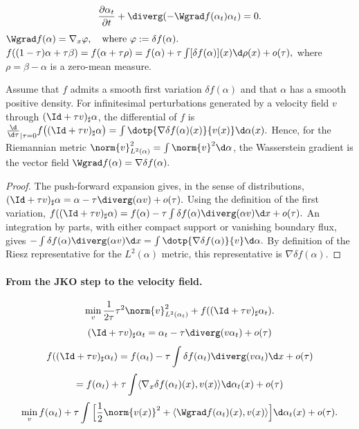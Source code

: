 \begin{equation}
\frac{\partial \alpha_t}{\partial t} + \diverg(-\Wgrad f(\alpha_t) \alpha_t) = 0. \label{eq:wassflow-pde}
\end{equation}
\(\Wgrad f(\alpha) = \nabla_x \varphi, \quad \text{where } \varphi:= \delta f(\alpha).\)
\(f((1-\tau)\alpha + \tau \beta) = f(\alpha + \tau \rho) = f(\alpha) + \tau \int [\delta f(\alpha)](x) \d \rho(x) + o(\tau),\)
where $\rho = \beta - \alpha$ is a zero-mean measure.

\begin{proposition}\label{prop-formal-wass-gradient}
Assume that $f$ admits a smooth first variation $\delta f(\alpha)$ and that $\alpha$ has a smooth positive density. For infinitesimal perturbations generated by a velocity field $v$ through $(\Id+\tau v)_\sharp\alpha$, the differential of $f$ is
\(\frac{\d}{\d\tau}_{|\tau=0} f\big((\Id+\tau v)_\sharp\alpha\big) = \int \dotp{\nabla \delta f(\alpha)(x)}{v(x)}\d\alpha(x).\)
Hence, for the Riemannian metric $\norm{v}_{L^2(\alpha)}^2=\int \norm{v}^2\d\alpha$, the Wasserstein gradient is the vector field
\(\Wgrad f(\alpha)=\nabla \delta f(\alpha).\)
\end{proposition}
\begin{proof}
The push-forward expansion gives, in the sense of distributions, \((\Id+\tau v)_\sharp\alpha = \alpha-\tau\diverg(\alpha v)+o(\tau).\)
Using the definition of the first variation, \(f((\Id+\tau v)_\sharp\alpha) = f(\alpha)-\tau\int \delta f(\alpha)\diverg(\alpha v)\d x+o(\tau).\)
An integration by parts, with either compact support or vanishing boundary flux, gives \(-\int \delta f(\alpha)\diverg(\alpha v)\d x = \int \dotp{\nabla\delta f(\alpha)}{v}\d\alpha.\)
By definition of the Riesz representative for the $L^2(\alpha)$ metric, this representative is $\nabla\delta f(\alpha)$.
\end{proof}
\paragraph{From the JKO step to the velocity field.}
$$
\min_{v} \frac{1}{2 \tau} \tau^2 \norm{v}_{L^2(\alpha_t)}^2 + f( (\Id + \tau v)_\sharp \alpha_t ).
$$
$$
(\Id + \tau v)_\sharp \alpha_t = \alpha_t - \tau \diverg( v \alpha_t ) + o(\tau)
$$
$$
f( (\Id + \tau v)_\sharp \alpha_t ) = f(\alpha_t) - \tau \int \delta f(\alpha_t) \diverg( v \alpha_t ) \d x + o(\tau)
$$
$$
= f(\alpha_t) + \tau \int \langle \nabla_x \delta f(\alpha_t)(x), v(x) \rangle \d \alpha_t(x) + o(\tau)
$$
$$
\min_{v} f(\alpha_t) + \tau \int \Big[ \frac{1}{2} \norm{v(x)}^2 + \langle \Wgrad f(\alpha_t)(x), v(x) \rangle \Big]\d \alpha_t(x) + o(\tau).
$$

